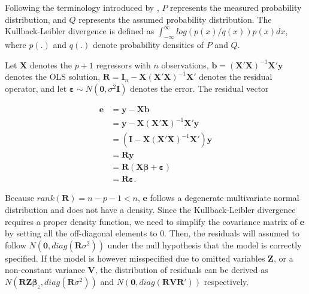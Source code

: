 \documentclass[]{interact}
\theoremstyle{plain}%
\theoremstyle{definition}
\theoremstyle{remark}
\begin{document}
Following the terminology introduced by \citet{kullback1951information},
\(P\) represents the measured probability distribution, and \(Q\)
represents the assumed probability distribution. The Kullback-Leibler
divergence is defined as
\(\int_{-\infty}^{\infty}log(p(x)/q(x))p(x)dx\), where \(p(.)\) and
\(q(.)\) denote probability densities of \(P\) and \(Q\).

Let \(\boldsymbol{X}\) denotes the \(p + 1\) regressors with \(n\)
observations,
\(\boldsymbol{b} = (\boldsymbol{X}'\boldsymbol{X})^{-1}\boldsymbol{X}'\boldsymbol{y}\)
denotes the OLS solution,
\(\boldsymbol{R} = \boldsymbol{I}_n -\boldsymbol{X}(\boldsymbol{X}'\boldsymbol{X})^{-1}\boldsymbol{X}'\)
denotes the residual operator, and let
\(\boldsymbol{\varepsilon} \sim N(\boldsymbol{0},\sigma^2\boldsymbol{I})\)
denotes the error. The residual vector

\begin{align*}
\boldsymbol{e} &= \boldsymbol{y} - \boldsymbol{X}\boldsymbol{b} \\
               &= \boldsymbol{y} - \boldsymbol{X}(\boldsymbol{X}'\boldsymbol{X})^{-1}\boldsymbol{X}'\boldsymbol{y} \\
               &= (\boldsymbol{I} -\boldsymbol{X}(\boldsymbol{X}'\boldsymbol{X})^{-1}\boldsymbol{X}')\boldsymbol{y} \\
               &= \boldsymbol{R}\boldsymbol{y} \\
               &= \boldsymbol{R}(\boldsymbol{X}\boldsymbol{\beta} + \boldsymbol{\varepsilon}) \\
               &= \boldsymbol{R}\boldsymbol{\varepsilon}.
\end{align*}

Because \(rank(\boldsymbol{R}) = n - p - 1 < n\), \(\boldsymbol{e}\)
follows a degenerate multivariate normal distribution and does not have
a density. Since the Kullback-Leibler divergence requires a proper
density function, we need to simplify the covariance matrix of
\(\boldsymbol{e}\) by setting all the off-diagonal elements to 0. Then,
the residuals will assumed to follow
\(N(\boldsymbol{0}, diag(\boldsymbol{R}\sigma^2))\) under the null
hypothesis that the model is correctly specified. If the model is
however misspecified due to omitted variables \(\boldsymbol{Z}\), or a
non-constant variance \(\boldsymbol{V}\), the distribution of residuals
can be derived as
\(N(\boldsymbol{R}\boldsymbol{Z}\boldsymbol{\beta}_z, diag(\boldsymbol{R}\sigma^2))\)
and
\(N(\boldsymbol{0}, diag(\boldsymbol{R}\boldsymbol{V}\boldsymbol{R}'))\)
respectively.
\end{document}
